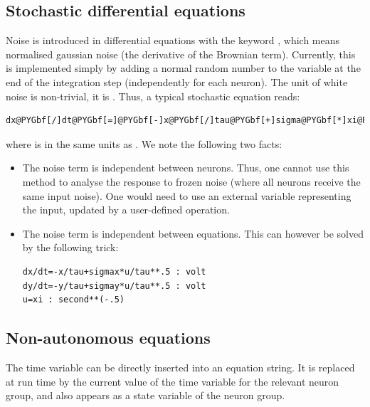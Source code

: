 \documentclass[letterpaper,10pt,english]{manual}
\begin{document}
\subsection{Stochastic differential equations}

Noise is introduced in differential equations with the keyword
, which means normalised gaussian noise (the derivative of the Brownian term).
Currently, this is implemented simply by adding a normal random number to the variable
at the end of the integration step (independently for each neuron).
The unit of white noise is non-trivial, it is . Thus, a typical stochastic
equation reads:

\begin{Verbatim}[commandchars=@\[\]]
dx@PYGbf[/]dt@PYGbf[=]@PYGbf[-]x@PYGbf[/]tau@PYGbf[+]sigma@PYGbf[*]xi@PYGbf[/]tau@PYGbf[*]@PYGbf[*]@PYGbf[.]@PYGaw[5]
\end{Verbatim}

where  is in the same units as . We note the following two facts:
\begin{itemize}
\item {} 
The noise term is independent between neurons. Thus, one cannot use this method to analyse
the response to frozen noise (where all neurons receive the same input noise). One would need
to use an external variable representing the input, updated by a user-defined operation.

\item {} 
The noise term is independent between equations. This can however be solved by the following
trick:

\begin{Verbatim}[commandchars=@\[\]]
dx/dt=-x/tau+sigmax*u/tau**.5 : volt
dy/dt=-y/tau+sigmay*u/tau**.5 : volt
u=xi : second**(-.5)
\end{Verbatim}

\end{itemize}

\subsection{Non-autonomous equations}

The time variable  can be directly inserted into an equation string.
It is replaced at run time by the current value of the time variable for the relevant
neuron group, and also appears as a state variable of the neuron group.
\end{document}
